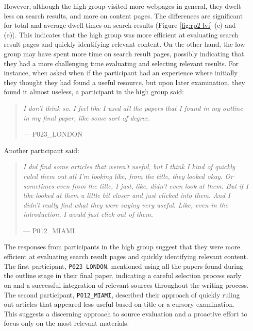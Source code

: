 \documentclass[letterpaper, nobind]{templates/ociamthesis}
\begin{document}
However, although the high group visited more webpages in general, they dwelt less on search results, and more on content pages.
The differences are significant for total and average dwell times on search results (Figure \ref{fig:rp2-lvi} (c) and (e)).
This indicates that the high group was more efficient at evaluating search result pages and quickly identifying relevant content.
On the other hand, the low group may have spent more time on search result pages, possibly indicating that they had a more challenging time evaluating and selecting relevant results.
For instance, when asked when if the participant had an experience where initially they thought they had found a useful resource, but upon later examination, they found it almost useless, a participant in the high group said:

\begin{quote}
\emph{I don't think so. I feel like I used all the papers that I found in my outline in my final paper, like some sort of degree.}

\hfill --- P023\_LONDON
\end{quote}

Another participant said:

\begin{quote}
\emph{I did find some articles that weren't useful, but I think I kind of quickly ruled them out all I'm looking like, from the title, they looked okay. Or sometimes even from the title, I just, like, didn't even look at them. But if I like looked at them a little bit closer and just clicked into them. And I didn't really find what they were saying very useful. Like, even in the introduction, I would just click out of them.}

\hfill --- P012\_MIAMI
\end{quote}

The responses from participants in the high group suggest that they were more efficient at evaluating search result pages and quickly identifying relevant content. The first participant, \texttt{P023\_LONDON}, mentioned using all the papers found during the outline stage in their final paper, indicating a careful selection process early on and a successful integration of relevant sources throughout the writing process.
The second participant, \texttt{P012\_MIAMI}, described their approach of quickly ruling out articles that appeared less useful based on title or a cursory examination. This suggests a discerning approach to source evaluation and a proactive effort to focus only on the most relevant materials.
\end{document}
